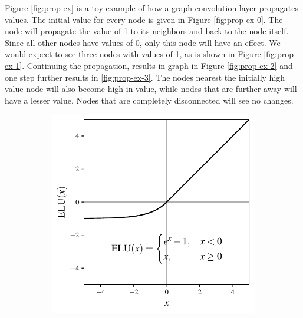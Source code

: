 \documentclass[../thesis.tex]{subfiles}
\begin{document}
\par Figure \ref{fig:prop-ex} is a toy example of how a graph convolution layer propagates values.
The initial value for every node is given in Figure \ref{fig:prop-ex-0}.
The node will propagate the value of 1 to its neighbors and back to the node itself.
Since all other nodes have values of 0, only this node will have an effect.
We would expect to see three nodes with values of 1, as is shown in Figure \ref{fig:prop-ex-1}.
Continuing the propagation, results in graph in Figure \ref{fig:prop-ex-2} and one step further results in \ref{fig:prop-ex-3}.
The nodes nearest the initially high value node will also become high in value, while nodes that are further away will have a lesser value.
Nodes that are completely disconnected will see no changes.

\begin{figure}[t]
	\centering
	\begin{subfigure}{0.49\textwidth}
		\includegraphics[width=\textwidth]{figures/elu.pdf}
	\end{subfigure}
	\hfill
	\begin{subfigure}{0.49\textwidth}

\end{subfigure}
\end{figure}
\end{document}
